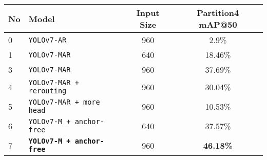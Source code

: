 \begin{tabular}{ l l c c}
  \toprule[1.5pt]
  No & Model                                       &  Input Size  &Partition4 mAP@50             \\%
  \midrule
  0  & \texttt{YOLOv7-AR}                          &     960      & 2.9\%                        \\%
  1  & \texttt{YOLOv7-MAR}                         &     640      & 18.46\%                      \\%
  3  & \texttt{YOLOv7-MAR}                         &     960      & 37.69\%                      \\%
  4  & \texttt{YOLOv7-MAR + rerouting}             &     960      & 30.04\%                      \\%
  5  & \texttt{YOLOv7-MAR + more head}             &     960      & 10.53\%                      \\%
  6  & \texttt{YOLOv7-M + anchor-free}             &     640      & 37.57\%                      \\%
  7  & \texttt{\textbf{YOLOv7-M + anchor-free}}    &     960      &\textbf{46.18\%}              \\%
  \bottomrule[1.5pt]
\end{tabular}